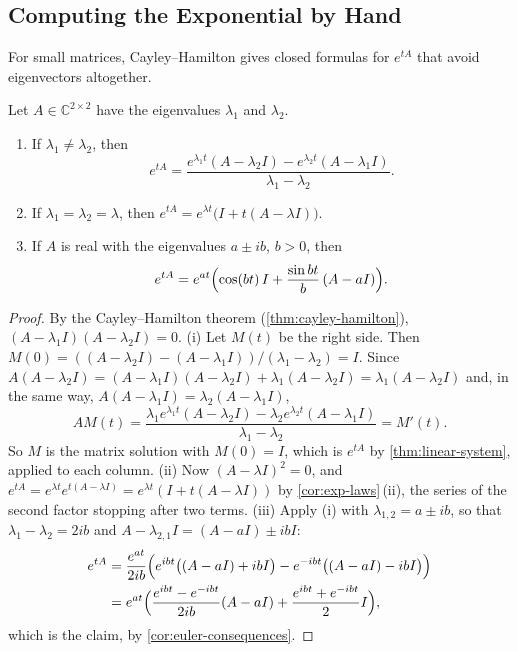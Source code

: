 \subsection{Computing the Exponential by Hand}

For small matrices, Cayley--Hamilton gives closed formulas for $e^{tA}$ that avoid eigenvectors altogether.

\begin{proposition}
\label{prop:exp-2x2}
Let $A\in\mathbb C^{2\times2}$ have the eigenvalues $\lambda_1$ and $\lambda_2$.
\begin{enumerate}
\item If $\lambda_1\ne\lambda_2$, then
\[
e^{tA}=\frac{e^{\lambda_1t}(A-\lambda_2I)-e^{\lambda_2t}(A-\lambda_1I)}{\lambda_1-\lambda_2}.
\]
\item If $\lambda_1=\lambda_2=\lambda$, then $e^{tA}=e^{\lambda t}\bigl(I+t(A-\lambda I)\bigr)$.
\item If $A$ is real with the eigenvalues $a\pm ib$, $b>0$, then
\[
e^{tA}=e^{at}\Bigl(\cos(bt)\,I+\frac{\sin bt}b\,(A-aI)\Bigr).
\]
\end{enumerate}
\end{proposition}

\begin{proof}
By the Cayley--Hamilton theorem (\cref{thm:cayley-hamilton}), $(A-\lambda_1I)(A-\lambda_2I)=0$. (i) Let $M(t)$ be the right side. Then $M(0)=((A-\lambda_2I)-(A-\lambda_1I))/(\lambda_1-\lambda_2)=I$. Since $A(A-\lambda_2I)=(A-\lambda_1I)(A-\lambda_2I)+\lambda_1(A-\lambda_2I)=\lambda_1(A-\lambda_2I)$ and, in the same way, $A(A-\lambda_1I)=\lambda_2(A-\lambda_1I)$,
\[
AM(t)=\frac{\lambda_1e^{\lambda_1t}(A-\lambda_2I)-\lambda_2e^{\lambda_2t}(A-\lambda_1I)}{\lambda_1-\lambda_2}=M'(t).
\]
So $M$ is the matrix solution with $M(0)=I$, which is $e^{tA}$ by \cref{thm:linear-system}, applied to each column. (ii) Now $(A-\lambda I)^2=0$, and $e^{tA}=e^{\lambda t}e^{t(A-\lambda I)}=e^{\lambda t}(I+t(A-\lambda I))$ by \cref{cor:exp-laws}\,(ii), the series of the second factor stopping after two terms. (iii) Apply (i) with $\lambda_{1,2}=a\pm ib$, so that $\lambda_1-\lambda_2=2ib$ and $A-\lambda_{2,1}I=(A-aI)\pm ibI$:
\[
\begin{aligned}
e^{tA}&=\frac{e^{at}}{2ib}\Bigl(e^{ibt}\bigl((A-aI)+ibI\bigr)-e^{-ibt}\bigl((A-aI)-ibI\bigr)\Bigr)\\
&=e^{at}\Bigl(\frac{e^{ibt}-e^{-ibt}}{2ib}(A-aI)+\frac{e^{ibt}+e^{-ibt}}2I\Bigr),
\end{aligned}
\]
which is the claim, by \cref{cor:euler-consequences}.
\end{proof}

